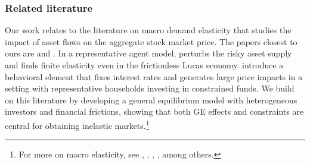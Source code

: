 %
\subsubsection*{Related literature}
Our work relates to the literature on macro demand elasticity that studies the impact of asset flows on the aggregate stock market price. The papers closest to ours are \cite{johnson2006dynamic} and \cite{gabaix2020search}. In a representative agent model, \cite{johnson2006dynamic} perturbs the risky asset supply and finds finite elasticity even in the frictionless Lucas economy. \cite{gabaix2020search} introduce a behavioral element that fixes interest rates and generates large price impacts in a setting with representative households investing in constrained funds. We build on this literature by developing a general equilibrium model with heterogeneous investors and financial frictions, showing that both GE effects and constraints are central for obtaining inelastic markets.\footnote{For more on macro elasticity, see \cite{johnson2008volume,johnson2009liquid}, \cite{Deuskar/Johnson/2011}, \cite{Li/Pearson/Zhang/2020}, \cite{Hartzmark/Solomon/2021}, among others.} 


